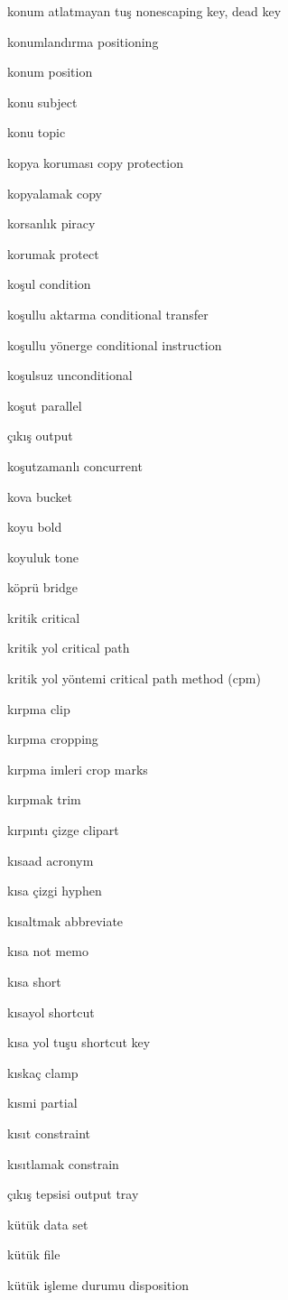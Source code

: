 \documentclass[12pt,fleqn]{article}\usepackage{../../common}
\begin{document}
konum atlatmayan tuş nonescaping key, dead key

konumlandırma positioning

konum position

konu subject

konu topic

kopya koruması copy protection

kopyalamak copy

korsanlık piracy

korumak protect

koşul condition

koşullu aktarma conditional transfer

koşullu yönerge conditional instruction

koşulsuz unconditional

koşut parallel

çıkış output

koşutzamanlı concurrent

kova bucket

koyu bold

koyuluk tone

köprü bridge

kritik critical

kritik yol critical path

kritik yol yöntemi critical path method (cpm)

kırpma clip

kırpma cropping

kırpma imleri crop marks

kırpmak trim

kırpıntı çizge clipart

kısaad acronym

kısa çizgi hyphen

kısaltmak abbreviate

kısa not memo

kısa short

kısayol shortcut

kısa yol tuşu shortcut key

kıskaç clamp

kısmi partial

kısıt constraint

kısıtlamak constrain

çıkış tepsisi output tray

kütük data set

kütük file

kütük işleme durumu disposition
\end{document}
